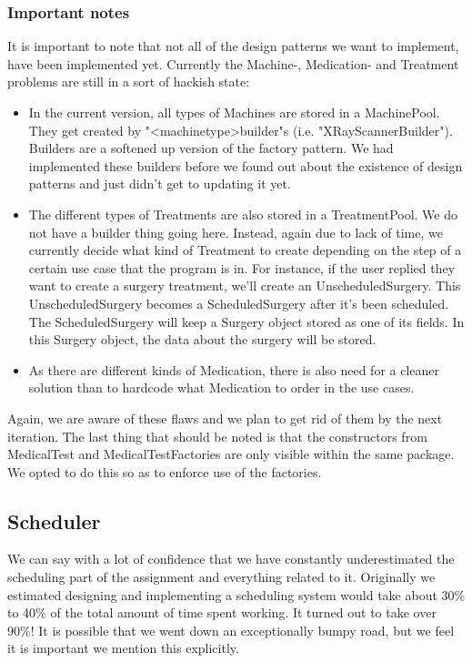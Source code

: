 \documentclass[11pt]{article}
\begin{document}
\subsubsection{Important notes}
It is important to note that not all of the design patterns we want to implement, have been implemented yet. Currently the Machine-, Medication- and Treatment problems are still in a sort of hackish state:
\begin{itemize}
\item{In the current version, all types of Machines are stored in a MachinePool. They get created by "\textless machinetype\textgreater builder"s (i.e. "XRayScannerBuilder"). Builders are a softened up version of the factory pattern. We had implemented these builders before we found out about the existence of design patterns and just didn't get to updating it yet.}
\item{The different types of Treatments are also stored in a TreatmentPool. We do not have a builder thing going here. Instead, again due to lack of time, we currently decide what kind of Treatment to create depending on the step of a certain use case that the program is in. For instance, if the user replied they want to create a surgery treatment, we'll create an UnscheduledSurgery. This UnscheduledSurgery becomes a ScheduledSurgery after it's been scheduled. The ScheduledSurgery will keep a Surgery object stored as one of its fields. In this Surgery object, the data about the surgery will be stored.}
\item{As there are different kinds of Medication, there is also need for a cleaner solution than to hardcode what Medication to order in the use cases.}
\end{itemize}
Again, we are aware of these flaws and we plan to get rid of them by the next iteration.
\newline 
The last thing that should be noted is that the constructors from MedicalTest and MedicalTestFactories are only visible within the same package. We opted to do this so as to enforce use of the factories.

\subsection{Scheduler}
We can say with a lot of confidence that we have constantly underestimated the scheduling part of the assignment and everything related to it. Originally we estimated designing and implementing a scheduling system would take about 30\% to 40\% of the total amount of time spent working. It turned out to take over 90\%! It is possible that we went down an exceptionally bumpy road, but we feel it is important we mention this explicitly. 
\end{document}
